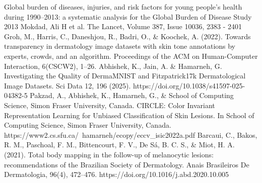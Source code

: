 \begin{thebibliography}{}
Global burden of diseases, injuries, and risk factors for young people's health during 1990–2013: a systematic analysis for the Global Burden of Disease Study 2013
Mokdad, Ali H et al.
The Lancet, Volume 387, Issue 10036, 2383 - 2401
Groh, M., Harris, C., Daneshjou, R., Badri, O., \& Koochek, A. (2022). Towards transparency in dermatology image datasets with skin tone annotations by experts, crowds, and an algorithm. Proceedings of the ACM on Human-Computer Interaction, 6(CSCW2), 1–26.
Abhishek, K., Jain, A. \& Hamarneh, G. Investigating the Quality of DermaMNIST and Fitzpatrick17k Dermatological Image Datasets. Sci Data 12, 196 (2025). https://doi.org/10.1038/s41597-025-04382-5
Pakzad, A., Abhishek, K., Hamarneh, G., \& School of Computing Science, Simon Fraser University, Canada. CIRCLE: Color Invariant Representation Learning for Unbiased Classification of Skin Lesions. In School of Computing Science, Simon Fraser University, Canada. https://www2.cs.sfu.ca/~hamarneh/ecopy/eccv\_isic2022a.pdf
Barcaui, C., Bakos, R. M., Paschoal, F. M., Bittencourt, F. V., De Sá, B. C. S., \& Miot, H. A. (2021). Total body mapping in the follow-up of melanocytic lesions: recommendations of the Brazilian Society of Dermatology. Anais Brasileiros De Dermatologia, 96(4), 472–476. https://doi.org/10.1016/j.abd.2020.10.005



\end{thebibliography}
